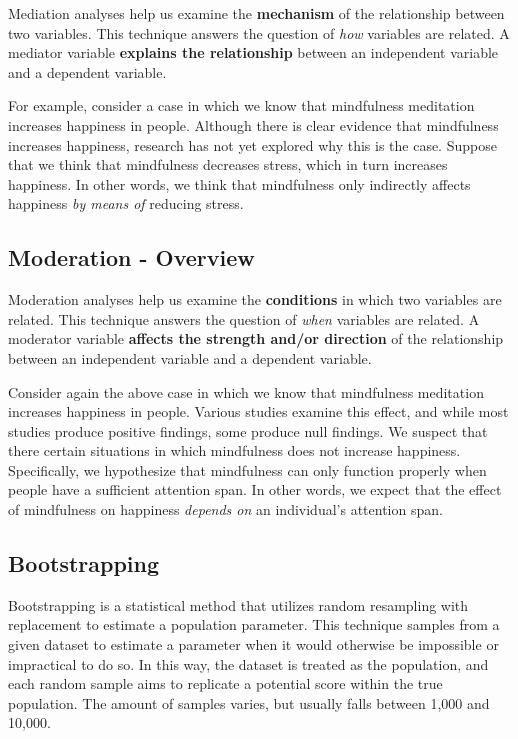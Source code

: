 \documentclass[]{book}
\begin{document}
Mediation analyses help us examine the \textbf{mechanism} of the relationship between two variables. This technique answers the question of \emph{how} variables are related. A mediator variable \textbf{explains the relationship} between an independent variable and a dependent variable.

For example, consider a case in which we know that mindfulness meditation increases happiness in people. Although there is clear evidence that mindfulness increases happiness, research has not yet explored why this is the case. Suppose that we think that mindfulness decreases stress, which in turn increases happiness. In other words, we think that mindfulness only indirectly affects happiness \emph{by means of} reducing stress.

\hypertarget{moderation---overview}{%
\subsection{Moderation - Overview}\label{moderation---overview}}

Moderation analyses help us examine the \textbf{conditions} in which two variables are related. This technique answers the question of \emph{when} variables are related. A moderator variable \textbf{affects the strength and/or direction} of the relationship between an independent variable and a dependent variable.

Consider again the above case in which we know that mindfulness meditation increases happiness in people. Various studies examine this effect, and while most studies produce positive findings, some produce null findings. We suspect that there certain situations in which mindfulness does not increase happiness. Specifically, we hypothesize that mindfulness can only function properly when people have a sufficient attention span. In other words, we expect that the effect of mindfulness on happiness \emph{depends on} an individual's attention span.

\hypertarget{bootstrapping}{%
\subsection{Bootstrapping}\label{bootstrapping}}

Bootstrapping is a statistical method that utilizes random resampling with replacement to estimate a population parameter. This technique samples from a given dataset to estimate a parameter when it would otherwise be impossible or impractical to do so. In this way, the dataset is treated as the population, and each random sample aims to replicate a potential score within the true population. The amount of samples varies, but usually falls between 1,000 and 10,000.
\end{document}
